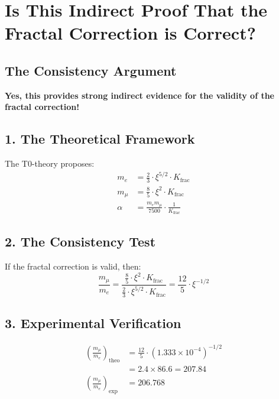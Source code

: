 	\section*{Is This Indirect Proof That the Fractal Correction is Correct?}
	
	\subsection*{The Consistency Argument}
	
	\begin{tcolorbox}[colback=green!5!white,colframe=green!75!black]
		\textbf{Yes, this provides strong indirect evidence for the validity of the fractal correction!}
	\end{tcolorbox}
	
	\subsection*{1. The Theoretical Framework}
	
	The T0-theory proposes:
	\begin{align*}
		m_e &= \frac{2}{3} \cdot \xi^{5/2} \cdot K_{\text{frac}} \\
		m_\mu &= \frac{8}{5} \cdot \xi^2 \cdot K_{\text{frac}} \\
		\alpha &= \frac{m_e m_\mu}{7500} \cdot \frac{1}{K_{\text{frac}}}
	\end{align*}
	
	\subsection*{2. The Consistency Test}
	
	If the fractal correction is valid, then:
	\[
	\frac{m_\mu}{m_e} = \frac{\frac{8}{5} \cdot \xi^2 \cdot K_{\text{frac}}}{\frac{2}{3} \cdot \xi^{5/2} \cdot K_{\text{frac}}} = \frac{12}{5} \cdot \xi^{-1/2}
	\]
	
	\subsection*{3. Experimental Verification}
	
	\begin{align*}
		\left(\frac{m_\mu}{m_e}\right)_{\text{theo}} &= \frac{12}{5} \cdot (1.333 \times 10^{-4})^{-1/2} \\
		&= 2.4 \times 86.6 = 207.84 \\
		\left(\frac{m_\mu}{m_e}\right)_{\text{exp}} &= 206.768
	\end{align*}
	
